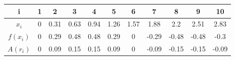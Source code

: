 \documentclass{article}
\begin{document}
\begin{minipage}{.5\linewidth}
	\huge
	\vspace{5pt}
	\begin{center}
	\Large
	\begin{tabular}{ |c|c|c|c|c|c|c|c|c|c|c| } 
	 \hline
	 i & 1 & 2 & 3 & 4 & 5 & 6 & 7 & 8 & 9 & 10\\ 
	 \hline
	$x_i$ & 0 & 0.31 & 0.63 & 0.94 & 1.26 & 1.57 & 1.88 & 2.2 & 2.51 & 2.83\\ 
	\hline
	$f(x_i)$ & 0 & 0.29 & 0.48 & 0.48 & 0.29 & 0 & -0.29 & -0.48 & -0.48 & -0.3\\ 
	\hline
	$A(r_i)$ & 0 & 0.09 & 0.15 & 0.15 & 0.09 & 0 & -0.09 & -0.15 & -0.15 & -0.09\\ 
	 \hline
	\end{tabular}
	\end{center}
	\end{minipage}
	
\end{document}
